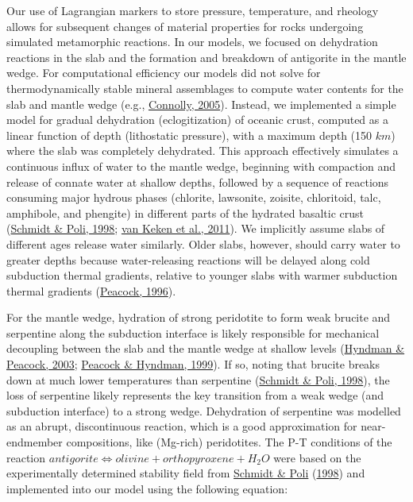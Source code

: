\documentclass[draft,linenumbers]{agujournal2018}
\begin{document}
Our use of Lagrangian markers to store pressure, temperature, and
rheology allows for subsequent changes of material properties for rocks
undergoing simulated metamorphic reactions. In our models, we focused on
dehydration reactions in the slab and the formation and breakdown of
antigorite in the mantle wedge. For computational efficiency our models
did not solve for thermodynamically stable mineral assemblages to
compute water contents for the slab and mantle wedge (e.g.,
\protect\hyperlink{ref-Connolly2005}{Connolly, 2005}). Instead, we
implemented a simple model for gradual dehydration (eclogitization) of
oceanic crust, computed as a linear function of depth (lithostatic
pressure), with a maximum depth (150 \(km\)) where the slab was
completely dehydrated. This approach effectively simulates a continuous
influx of water to the mantle wedge, beginning with compaction and
release of connate water at shallow depths, followed by a sequence of
reactions consuming major hydrous phases (chlorite, lawsonite, zoisite,
chloritoid, talc, amphibole, and phengite) in different parts of the
hydrated basaltic crust (\protect\hyperlink{ref-Schmidt1998}{Schmidt \&
Poli, 1998}; \protect\hyperlink{ref-VanKeken2011}{van Keken et al.,
2011}). We implicitly assume slabs of different ages release water
similarly. Older slabs, however, should carry water to greater depths
because water-releasing reactions will be delayed along cold subduction
thermal gradients, relative to younger slabs with warmer subduction
thermal gradients (\protect\hyperlink{ref-Peacock1996}{Peacock, 1996}).

For the mantle wedge, hydration of strong peridotite to form weak
brucite and serpentine along the subduction interface is likely
responsible for mechanical decoupling between the slab and the mantle
wedge at shallow levels (\protect\hyperlink{ref-Hyndman2003}{Hyndman \&
Peacock, 2003}; \protect\hyperlink{ref-Peacock1999a}{Peacock \& Hyndman,
1999}). If so, noting that brucite breaks down at much lower
temperatures than serpentine
(\protect\hyperlink{ref-Schmidt1998}{Schmidt \& Poli, 1998}), the loss
of serpentine likely represents the key transition from a weak wedge
(and subduction interface) to a strong wedge. Dehydration of serpentine
was modelled as an abrupt, discontinuous reaction, which is a good
approximation for near-endmember compositions, like (Mg-rich)
peridotites. The P-T conditions of the reaction
\(antigorite \Leftrightarrow olivine + orthopyroxene + H_{2}O\) were
based on the experimentally determined stability field from
\protect\hyperlink{ref-Schmidt1998}{Schmidt \& Poli}
(\protect\hyperlink{ref-Schmidt1998}{1998}) and implemented into our
model using the following equation:
\end{document}
